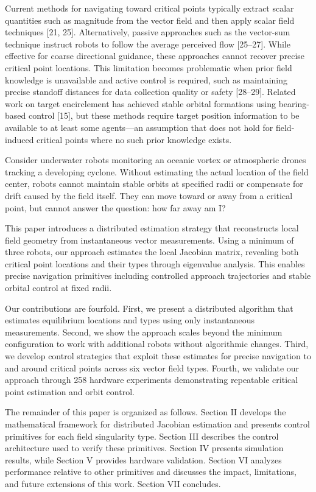 \documentclass[lettersize,journal]{IEEEtran}
\begin{document}
Current methods for navigating toward critical points typically extract scalar quantities such as magnitude from the vector field and then apply scalar field techniques [21, 25]. Alternatively, passive approaches such as the vector-sum technique instruct robots to follow the average perceived flow [25--27]. While effective for coarse directional guidance, these approaches cannot recover precise critical point locations. This limitation becomes problematic when prior field knowledge is unavailable and active control is required, such as maintaining precise standoff distances for data collection quality or safety [28--29]. Related work on target encirclement has achieved stable orbital formations using bearing-based control [15], but these methods require target position information to be available to at least some agents—an assumption that does not hold for field-induced critical points where no such prior knowledge exists.

Consider underwater robots monitoring an oceanic vortex or atmospheric drones tracking a developing cyclone. Without estimating the actual location of the field center, robots cannot maintain stable orbits at specified radii or compensate for drift caused by the field itself. They can move toward or away from a critical point, but cannot answer the question: how far away am I?

This paper introduces a distributed estimation strategy that reconstructs local field geometry from instantaneous vector measurements. Using a minimum of three robots, our approach estimates the local Jacobian matrix, revealing both critical point locations and their types through eigenvalue analysis. This enables precise navigation primitives including controlled approach trajectories and stable orbital control at fixed radii.

Our contributions are fourfold. First, we present a distributed algorithm that estimates equilibrium locations and types using only instantaneous measurements. Second, we show the approach scales beyond the minimum configuration to work with additional robots without algorithmic changes. Third, we develop control strategies that exploit these estimates for precise navigation to and around critical points across six vector field types. Fourth, we validate our approach through 258 hardware experiments demonstrating repeatable critical point estimation and orbit control.

The remainder of this paper is organized as follows. Section II develops the mathematical framework for distributed Jacobian estimation and presents control primitives for each field singularity type. Section III describes the control architecture used to verify these primitives. Section IV presents simulation results, while Section V provides hardware validation. Section VI analyzes performance relative to other primitives and discusses the impact, limitations, and future extensions of this work. Section VII concludes.
\end{document}
